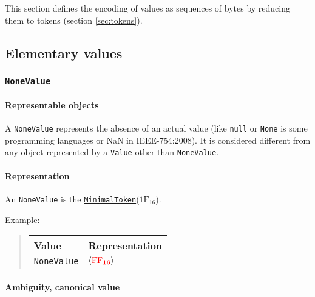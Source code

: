 \documentclass[headings=normal, headsepline, numbers=noenddot, fleqn, a4paper]{scrartcl}
\newcommand{\HexNumber}[1]{\mathrm{#1}_{16}}
\newcommand{\DborSyntaxIdent}[1]{\texttt{#1}}
\newcommand{\DborSyntaxIdentRef}[1]{\hyperlink{sec:def:#1}{\DborSyntaxIdent{#1}}}
\newcommand{\DborFirstByte}[2]{\mathbf{\textcolor{#1}{\HexNumber{#2}}}}
\newcommand{\DborFirstByteNone}[1]{\DborFirstByte{red}{#1}}
\begin{document}
    This section defines the encoding of values as sequences of bytes by reducing them to tokens
    (section \ref{sec:tokens}).


    \subsection{Elementary values}

    \subsubsection{\DborSyntaxIdent{NoneValue}}
    \label{sec:def:NoneValue}
    \hypertarget{sec:def:NoneValue}{}

    \paragraph{Representable objects}

    A \DborSyntaxIdent{NoneValue} represents the absence of an actual value (like \texttt{null} or \texttt{None} is some
    programming languages or NaN in IEEE-754:2008).
    It is considered different from any object represented by a \DborSyntaxIdentRef{Value} other than
    \DborSyntaxIdent{NoneValue}.

    \paragraph{Representation}

    An \DborSyntaxIdent{NoneValue} is the \DborSyntaxIdentRef{MinimalToken}($\HexNumber{1F}$).

    \smallskip
    \noindent
    Example:
    \nolinebreak
    \begin{quote}    
        \begin{tabular}{ll}
            \toprule
            Value & Representation \\
            \midrule
            \DborSyntaxIdent{NoneValue} 
                & $\langle \DborFirstByteNone{FF} \rangle$ \\
            \bottomrule
        \end{tabular}
    \end{quote}

    \paragraph{Ambiguity, canonical value}
\end{document}
